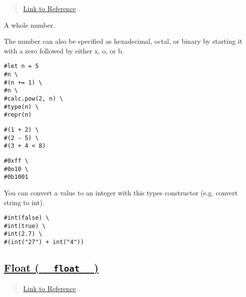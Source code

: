 \begin{quote}
\href{https://typst.app/docs/reference/foundations/int/}{Link to
Reference} .
\end{quote}

A whole number.

The number can also be specified as hexadecimal, octal, or binary by
starting it with a zero followed by either x, o, or b.

\begin{verbatim}
#let n = 5
#n \
#(n += 1) \
#n \
#calc.pow(2, n) \
#type(n) \
#repr(n)
\end{verbatim}

\pandocbounded{}

\begin{verbatim}
#(1 + 2) \
#(2 - 5) \
#(3 + 4 < 8)
\end{verbatim}

\pandocbounded{}

\begin{verbatim}
#0xff \
#0o10 \
#0b1001
\end{verbatim}

\pandocbounded{}

You can convert a value to an integer with this type\textquotesingle s
constructor (e.g. convert string to int).

\begin{verbatim}
#int(false) \
#int(true) \
#int(2.7) \
#(int("27") + int("4"))
\end{verbatim}

\pandocbounded{}

\subsection{\texorpdfstring{\hyperref[float-float]{Float (
\texttt{\ }{\texttt{\ float\ }}\texttt{\ }
)}}{Float (   float   )}}\label{float-float}

\begin{quote}
\href{https://typst.app/docs/reference/foundations/float/}{Link to
Reference} .
\end{quote}

